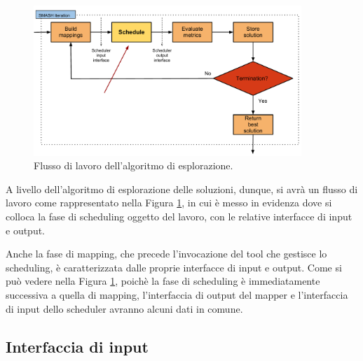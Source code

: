\begin{figure}
 \begin{center}
  \includegraphics[width=0.9\textwidth]{capitoli/figure/cap3/MapperWorkflow.pdf}
  \caption{Flusso di lavoro dell'algoritmo di esplorazione.}
  \label{fig:mapperWorkflow}
 \end{center}
\end{figure}

A livello dell'algoritmo di esplorazione delle soluzioni, dunque, si avrà un 
flusso di lavoro come rappresentato nella Figura \ref{fig:mapperWorkflow}, in 
cui è messo in evidenza dove si colloca la fase di scheduling oggetto del 
lavoro, con le relative interfacce di input e output.

Anche la fase di mapping, che precede l'invocazione del tool che gestisce lo 
scheduling, è caratterizzata dalle proprie interfacce di input e output. Come 
si può vedere nella Figura \ref{fig:mapperWorkflow}, poichè la fase di 
scheduling è immediatamente successiva a quella di mapping, l'interfaccia di 
output del mapper e l'interfaccia di input dello scheduler avranno alcuni dati 
in comune.


\subsection{Interfaccia di input}


